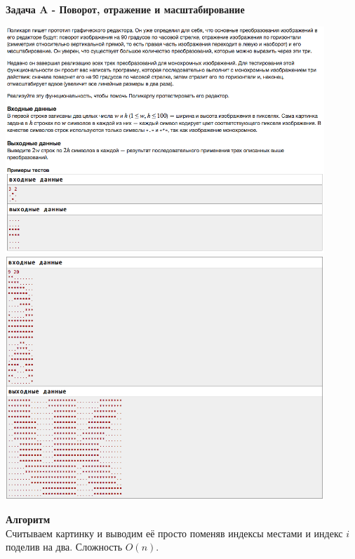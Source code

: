 \documentclass[a4paper,12pt]{article}
\begin{document}
\textbf{{\large Задача A - Поворот, отражение и масштабирование}} \\
\begin{center}
\includegraphics[width=0.9\textwidth]{VK_Qual_2/VK_Qual_A1.png}\\
\includegraphics[width=0.9\textwidth]{VK_Qual_2/VK_Qual_A2.png}\\ [1cm]
\end{center}
\textbf{{\large Алгоритм}} \\
Считываем картинку и выводим её просто поменяв индексы местами и индекс $i$ поделив на два. Сложность $O(n)$.\\
\end{document}
